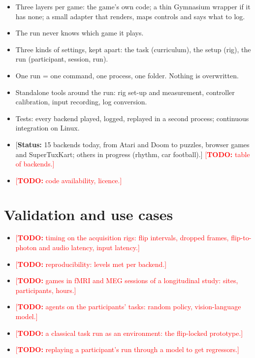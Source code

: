 \documentclass{article}
\newcommand{\TODO}[1]{\textcolor{red}{[\textbf{TODO:} #1]}}
\newcommand{\status}[1]{\textcolor{teal!70!black}{[\textbf{Status:} #1]}}
\begin{document}
\begin{itemize}
  \item Three layers per game: the game's own code; a thin Gymnasium wrapper if it has none; a small adapter that renders, maps controls and says what to log.
  \item The run never knows which game it plays.
  \item Three kinds of settings, kept apart: the task (curriculum), the setup (rig), the run (participant, session, run).
  \item One run = one command, one process, one folder. Nothing is overwritten.
  \item Standalone tools around the run: rig set-up and measurement, controller calibration, input recording, log conversion.
  \item Tests: every backend played, logged, replayed in a second process; continuous integration on Linux.
  \item \status{15 backends today, from Atari and Doom to puzzles, browser games and SuperTuxKart; others in progress (rhythm, car football).} \TODO{table of backends.}
  \item \TODO{code availability, licence.}
\end{itemize}

\section{Validation and use cases}
\label{sec:validation}

\begin{itemize}
  \item \TODO{timing on the acquisition rigs: flip intervals, dropped frames, flip-to-photon and audio latency, input latency.}
  \item \TODO{reproducibility: levels met per backend.}
  \item \TODO{games in fMRI and MEG sessions of a longitudinal study: sites, participants, hours.}
  \item \TODO{agents on the participants' tasks: random policy, vision-language model.}
  \item \TODO{a classical task run as an environment: the flip-locked prototype.}
  \item \TODO{replaying a participant's run through a model to get regressors.}
\end{itemize}

\end{document}
